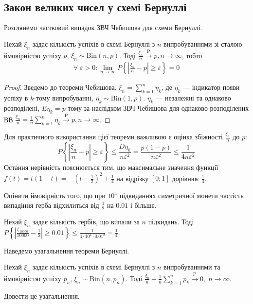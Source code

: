 \subsection{Закон великих чисел у схемі Бернуллі}
Розглянемо частковий випадок ЗВЧ Чебишова для схеми Бернуллі.
\begin{theorem*}
    Нехай $\xi_n$ задає кількість успіхів в схемі Бернуллі з $n$ випробуваннями зі сталою ймовірністю успіху $p$, $\xi_n \sim \mathrm{Bin}(n, p)$. Тоді 
    $\frac{\xi_n}{n}  \overset{\mathrm{P}}{\longrightarrow} p, n\to\infty$, тобто
    \begin{gather}
        \forall \; \varepsilon >0 : \lim_{n \rightarrow \infty} P\left\{ \left| \frac{\xi_n}{n} - p\right| \geq \varepsilon\right\} = 0
    \end{gather}
\end{theorem*}
\begin{proof}
    Зведемо до теореми Чебишова. $\xi_n = \sum\limits_{k=1}^n \eta_k$, де $\eta_k$ --- індикатор появи успіху в $k$-тому випробуванні,
    $\eta_k \sim \mathrm{Bin}(1, p)$. $\eta_k$ --- незалежні та однаково розподілені, $E\eta_k = p$ тому за наслідком ЗВЧ Чебишова для однаково
    розподілених ВВ
    $\frac{\xi_n}{n} = \frac{1}{n} \sum\limits_{k=1}^n \eta_k \overset{\mathrm{P}}{\longrightarrow} p, n\to\infty$.
\end{proof}
\begin{remark}
    Для практичного використання цієї теореми важливою є оцінка збіжності $\frac{\xi_n}{n}$ до $p$:
    $$P\left\{ \left| \frac{\xi_n}{n} - p\right| \geq \varepsilon\right\} \leq \frac{D\eta_k}{n \varepsilon^2} = \frac{p(1-p)}{n \varepsilon^2} \leq \frac{1}{4n \varepsilon^2}$$
    Остання нерівність пояснюється тим, що максимальне значення функції $f(t) = t(1-t) = -\left(t - \frac{1}{2}\right)^2 + \frac{1}{4}$ на відрізку $[0;1]$ дорівнює $\frac{1}{4}$.
\end{remark}
\begin{example}
    Оцінити ймовірність того, що при $10^4$ підкиданнях симетричної монети частість випадіння герба відхилиться від $\frac{1}{2}$ на $0.01$ і більше.

    Нехай $\xi_n$ задає кількість гербів, що випали за $n$ підкидань. Тоді
    $P\left\{ \left| \frac{\xi_{10000}}{10000} - \frac{1}{2}\right| \geq 0.01\right\} \leq \frac{1}{4\cdot 10^4 \cdot 0.01^2} = \frac{1}{4}$.
\end{example}
Наведемо узагальнення теореми Бернуллі.
\begin{theorem*}
    Нехай $\xi_n$ задає кількість успіхів в схемі Бернуллі з $n$ випробуваннями та ймовірністю успіху $p_n$, $\xi_n \sim \mathrm{Bin}(n, p_n)$.
    Тоді 
    $\frac{\xi_n}{n} - \frac{1}{n}\sum\limits_{k=1}^n p_k \overset{\mathrm{P}}{\longrightarrow} 0, \; n \to \infty$.
\end{theorem*}
\begin{exercise}
    Довести це узагальнення.
\end{exercise}

